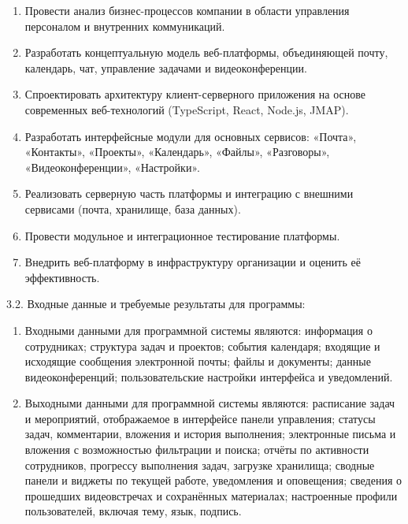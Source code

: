 \begin{enumerate}
\item Провести анализ бизнес-процессов компании в области управления персоналом и внутренних коммуникаций.
\item Разработать концептуальную модель веб-платформы, объединяющей почту, календарь, чат, управление задачами и видеоконференции.
\item Спроектировать архитектуру клиент-серверного приложения на основе современных веб-технологий (TypeScript, React, Node.js, JMAP).
\item Разработать интерфейсные модули для основных сервисов: «Почта», «Контакты», «Проекты», «Календарь», «Файлы», «Разговоры», «Видеоконференции», «Настройки».
\item Реализовать серверную часть платформы и интеграцию с внешними сервисами (почта, хранилище, база данных).
\item Провести модульное и интеграционное тестирование платформы.
\item Внедрить веб-платформу в инфраструктуру организации и оценить её эффективность.
\end{enumerate}

{\parindent0pt
  3.2. Входные данные и требуемые результаты для программы:}

\begin{enumerate}
\item Входными данными для программной системы являются: информация о сотрудниках; структура задач и проектов; события календаря; входящие и исходящие сообщения электронной почты; файлы и документы; данные видеоконференций; пользовательские настройки интерфейса и уведомлений.
\item Выходными данными для программной системы являются: расписание задач и мероприятий, отображаемое в интерфейсе панели управления; статусы задач, комментарии, вложения и история выполнения; электронные письма и вложения с возможностью фильтрации и поиска; отчёты по активности сотрудников, прогрессу выполнения задач, загрузке хранилища; сводные панели и виджеты по текущей работе, уведомления и оповещения; сведения о прошедших видеовстречах и сохранённых материалах; настроенные профили пользователей, включая тему, язык, подпись.
\end{enumerate}

